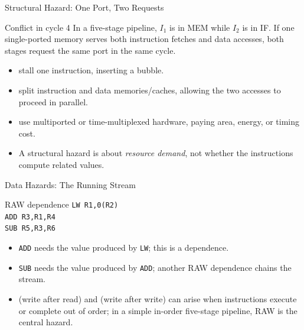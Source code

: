 \documentclass[aspectratio=169]{beamer}
\begin{document}
\begin{frame}{Structural Hazard: One Port, Two Requests}
  \begin{exampleblock}{Conflict in cycle 4}
    In a five-stage pipeline, $I_1$ is in MEM while $I_2$ is in IF. If one
    single-ported memory serves both instruction fetches and data accesses,
    both stages request the same port in the same cycle.
  \end{exampleblock}
  \begin{itemize}
    \item {} stall one instruction, inserting a bubble.
    \item {} split instruction and data memories/caches, allowing
      the two accesses to proceed in parallel.
    \item {} use multiported or time-multiplexed hardware, paying
      area, energy, or timing cost.
    \item A structural hazard is about \emph{resource demand}, not whether the
      instructions compute related values.
  \end{itemize}
\end{frame}

\begin{frame}{Data Hazards: The Running Stream}
  \begin{exampleblock}{RAW dependence}
    \texttt{LW R1,0(R2)}\\
    \texttt{ADD R3,R1,R4}\\
    \texttt{SUB R5,R3,R6}
  \end{exampleblock}
  \begin{itemize}
    \item \texttt{ADD} needs the value produced by \texttt{LW}; this is a
       dependence.
    \item \texttt{SUB} needs the value produced by \texttt{ADD}; another RAW
      dependence chains the stream.
    \item {} (write after read) and  (write after write) can
      arise when instructions execute or complete out of order; in a simple
      in-order five-stage pipeline, RAW is the central hazard.
  \end{itemize}
\end{frame}
\end{document}
